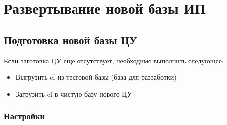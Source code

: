 \section{Развертывание новой базы ИП}
\subsection{Подготовка новой базы ЦУ}

Если заготовка ЦУ еще отсутствует, необходимо выполнить следующее:
\begin{itemize}
    \item Выгрузить cf из тестовой базы (база для разработки)
    \item Загрузить cf в чистую базу нового ЦУ
\end{itemize}


\subsubsection{Настройки}
